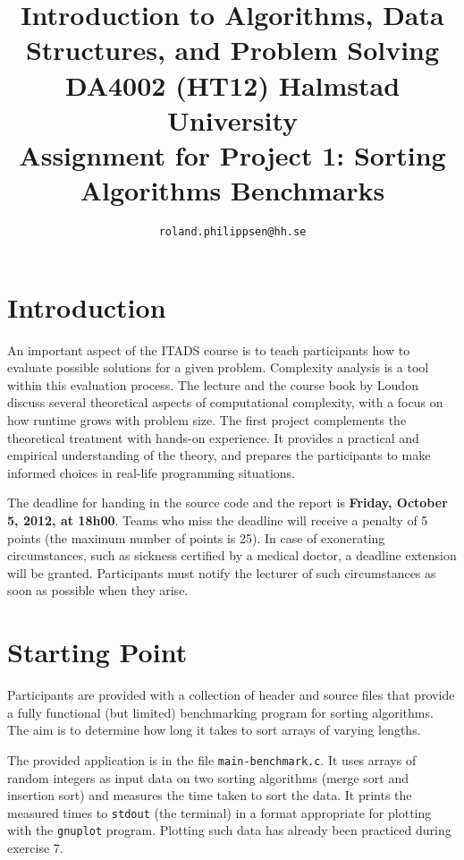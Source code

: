 \documentclass[a4paper,10pt]{article}
\begin{document}
\title{
  {\normalsize
    Introduction to Algorithms, Data Structures, and Problem Solving\\
    DA4002 (HT12) Halmstad University}\\
  Assignment for Project 1: Sorting Algorithms Benchmarks\\
}
\author{
  \texttt{roland.philippsen@hh.se}
}
\maketitle



\section{Introduction}

An important aspect of the ITADS course is to teach participants how to evaluate possible solutions for a given problem.
Complexity analysis is a tool within this evaluation process.
The lecture and the course book by Loudon~\cite{loudon} discuss several theoretical aspects of computational complexity, with a focus on how runtime grows with problem size.
The first project complements the theoretical treatment with hands-on experience.
It provides a practical and empirical understanding of the theory, and prepares the participants to make informed choices in real-life programming situations.

The deadline for handing in the source code and the report is \textbf{Friday, October 5, 2012, at 18h00}.
Teams who miss the deadline will receive a penalty of 5 points (the maximum number of points is 25).
In case of exonerating circumstances, such as sickness certified by a medical doctor, a deadline extension will be granted.
Participants must notify the lecturer of such circumstances as soon as possible when they arise.



\section{Starting Point}

Participants are provided with a collection of header and source files that provide a fully functional (but limited) benchmarking program for sorting algorithms.
The aim is to determine how long it takes to sort arrays of varying lengths.

The provided application is in the file \texttt{main-benchmark.c}.
It uses arrays of random integers as input data on two sorting algorithms (merge sort and insertion sort) and measures the time taken to sort the data.
It prints the measured times to \texttt{stdout} (the terminal) in a format appropriate for plotting with the \texttt{gnuplot} program.
Plotting such data has already been practiced during exercise 7.
\end{document}
